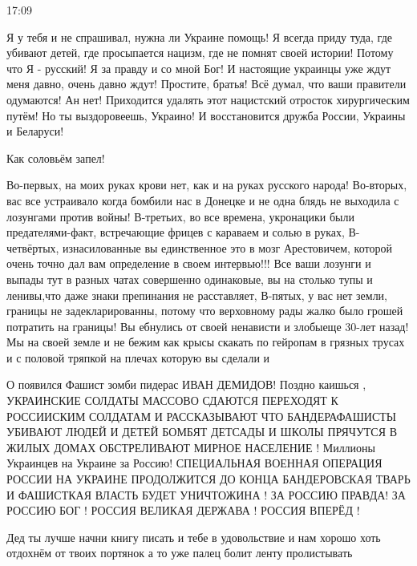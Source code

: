 17:09

Я у тебя и не спрашивал, нужна ли Украине помощь! Я всегда приду туда, где
убивают детей, где просыпается нацизм, где не помнят своей истории! Потому что
Я - русский! Я за правду и со мной Бог! И настоящие украинцы уже ждут меня
давно, очень давно ждут! Простите, братья! Всё думал, что ваши правители
одумаются! Ан нет! Приходится удалять этот нацистский отросток хирургическим
путём! Но ты выздоровеешь, Украино! И восстановится дружба России, Украины и
Беларуси!


Как соловьём запел!

Во-первых, на моих руках крови нет, как и на руках русского народа!
Во-вторых, вас все устраивало когда бомбили нас в Донецке и не одна блядь не выходила с лозунгами против войны!
В-третьих, во все времена, укронацики были предателями-факт, встречающие фрицев с караваем и солью в руках,
В-четвёртых, изнасилованные вы единственное это в мозг Арестовичем, которой очень точно дал вам определение в своем интервью!!!
Все ваши лозунги и выпады тут в разных чатах совершенно одинаковые, вы на столько тупы и ленивы,что даже знаки препинания не расставляет,
В-пятых, у вас нет земли, границы не задекларированны, потому что верховному рады жалко было грошей потратить на границы!
Вы ебнулись от своей ненависти и злобыеще 30-лет назад!
Мы на своей земле и не бежим как крысы скакать по гейропам в грязных трусах и с половой тряпкой на плечах которую вы сделали и


О появился Фашист зомби пидерас ИВАН ДЕМИДОВ! Поздно каишься , УКРАИНСКИЕ
СОЛДАТЫ МАССОВО СДАЮТСЯ ПЕРЕХОДЯТ К РОССИИСКИМ СОЛДАТАМ И РАССКАЗЫВАЮТ ЧТО
БАНДЕРАФАШИСТЫ УБИВАЮТ ЛЮДЕЙ И ДЕТЕЙ БОМБЯТ ДЕТСАДЫ И ШКОЛЫ ПРЯЧУТСЯ В ЖИЛЫХ
ДОМАХ ОБСТРЕЛИВАЮТ МИРНОЕ НАСЕЛЕНИЕ ! Миллионы Украинцев на Украине за Россию!
СПЕЦИАЛЬНАЯ ВОЕННАЯ ОПЕРАЦИЯ РОССИИ НА УКРАИНЕ ПРОДОЛЖИТСЯ ДО КОНЦА
БАНДЕРОВСКАЯ ТВАРЬ И ФАШИСТКАЯ ВЛАСТЬ БУДЕТ УНИЧТОЖИНА ! ЗА РОССИЮ ПРАВДА! ЗА
РОССИЮ БОГ ! РОССИЯ ВЕЛИКАЯ ДЕРЖАВА ! РОССИЯ ВПЕРЁД !

Дед ты лучше начни книгу писать и тебе в удовольствие и нам хорошо хоть
отдохнём от твоих портянок а то уже палец болит ленту пролистывать

